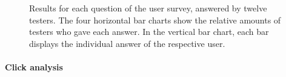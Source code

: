 \begin{figure}[t]
        \caption[Results for each question of the user survey.]{
        Results for each question of the user survey, answered by twelve testers.
        The four horizontal bar charts show the relative amounts of testers who gave each answer.
        In the vertical bar chart, each bar displays the individual answer of the respective user.
        }
        \label{figure:evaluation:user:survey-report}
\end{figure}

\FloatBarrier

\paragraph{Click analysis}

